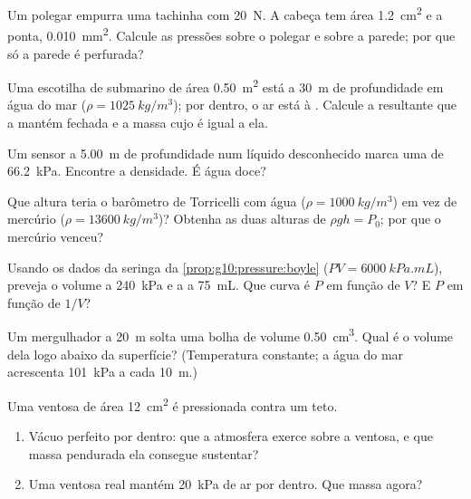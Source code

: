 \begin{exercise}[$\star\star$]\label{exo:g10:pressure:6}
Um polegar empurra uma tachinha com \qty{20}{N}. A cabeça tem área
\qty{1.2}{cm^2} e a ponta, \qty{0.010}{mm^2}. Calcule as pressões sobre o
polegar e sobre a parede; por que só a parede é perfurada?
\end{exercise}

\begin{exercise}[$\star\star$]\label{exo:g10:pressure:7}
Uma escotilha de submarino de área \qty{0.50}{m^2} está a \qty{30}{m} de
profundidade em água do mar ($\rho = \qty{1025}{kg/m^3}$); por dentro, o
ar está à . Calcule a  resultante que a mantém
fechada e a massa cujo  é igual a ela.
\end{exercise}

\begin{exercise}[$\star\star$]\label{exo:g10:pressure:8}
Um sensor a \qty{5.00}{m} de profundidade num líquido desconhecido marca
uma  de \qty{66.2}{kPa}. Encontre a densidade. É água
doce?
\end{exercise}

\begin{exercise}[$\star\star$]\label{exo:g10:pressure:9}
Que altura teria o barômetro de Torricelli com água
($\rho = \qty{1000}{kg/m^3}$) em vez de mercúrio
($\rho = \qty{13600}{kg/m^3}$)? Obtenha as duas alturas de
$\rho g h = P_0$; por que o mercúrio venceu?
\end{exercise}

\begin{exercise}[$\star\star$]\label{exo:g10:pressure:10}
Usando os dados da seringa da \cref{prop:g10:pressure:boyle}
($PV = \qty{6000}{kPa.mL}$), preveja o volume a \qty{240}{kPa} e a
 a \qty{75}{mL}. Que curva é $P$ em função de $V$? E $P$ em função
de $1/V$?
\end{exercise}

\begin{exercise}[$\star\star$]\label{exo:g10:pressure:11}
Um mergulhador a \qty{20}{m} solta uma bolha de volume \qty{0.50}{cm^3}.
Qual é o volume dela logo abaixo da superfície? (Temperatura constante; a
água do mar acrescenta \qty{101}{kPa} a cada \qty{10}{m}.)
\end{exercise}

\begin{exercise}[$\star\star\star$]\label{exo:g10:pressure:12}
Uma ventosa de área \qty{12}{cm^2} é pressionada contra um teto.
\begin{enumerate}
  \item Vácuo perfeito por dentro: que  a atmosfera exerce sobre a
        ventosa, e que massa pendurada ela consegue sustentar?
  \item Uma ventosa real mantém \qty{20}{kPa} de ar por dentro. Que massa
        agora?
\end{enumerate}
\end{exercise}

